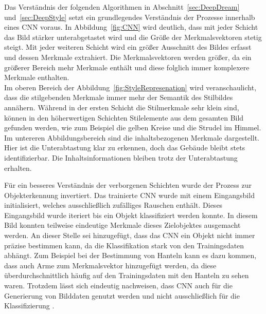\documentclass[times, 11pt,twocolumn]{article}
\begin{document}
\label{sec:Stilsynthese}
Das Verständnis der folgenden Algorithmen in Abschnitt~\ref{sec:DeepDream} und~\ref{sec:DeepStyle} setzt ein grundlegendes Verständnis der Prozesse innerhalb eines CNN voraus. In Abbildung~\ref{fig:CNN} wird deutlich, dass mit jeder Schicht das Bild stärker unterabgetastet wird und die Größe der Merkmalsvektoren stetig steigt. Mit jeder weiteren Schicht wird ein größer Ausschnitt des Bildes erfasst und dessen Merkmale extrahiert. Die Merkmalsvektoren werden größer, da ein größerer Bereich mehr Merkmale enthält und diese folglich immer komplexere Merkmale enthalten. \\
Im oberen Bereich der Abbildung~\ref{fig:StyleRepresenation} wird veranschaulicht, dass die stilgebenden Merkmale immer mehr der Semantik des Stilbildes annähern. Während in der ersten Schicht die Stilmerkmale sehr klein sind, können in den höherwertigen Schichten Stilelemente aus dem gesamten Bild gefunden werden, wie zum Beispiel die gelben Kreise und die Strudel im Himmel. Im untereren Abbildungsbereich sind die inhaltsbezogenen Merkmale dargestellt. Hier ist die Unterabtastung klar zu erkennen, doch das Gebäude bleibt stets identifizierbar. Die Inhaltsinformationen bleiben trotz der Unterabtastung erhalten.

Für ein besseres Verständnis der verborgenen Schichten wurde der Prozess zur Objekterkennung invertiert. Das trainierte CNN wurde mit einem Eingangsbild initialisiert, welches ausschließlich zufälliges Rauschen enthält. Dieses Eingangsbild wurde iteriert bis ein Objekt klassifiziert werden konnte. In diesem Bild konnten teilweise eindeutige Merkmale dieses Zielobjektes ausgemacht werden. An dieser Stelle sei hinzugefügt, dass das CNN ein Objekt nicht immer präzise bestimmen kann, da die Klassifikation stark von den Trainingsdaten abhängt. Zum Beispiel bei der Bestimmung von Hanteln kann es dazu kommen, dass auch Arme zum Merkmalsvektor hinzugefügt werden, da diese überdurchschnittlich häufig auf den Trainingsdaten mit den Hanteln zu sehen waren. 
Trotzdem lässt sich eindeutig nachweisen, dass CNN auch für die Generierung von Bilddaten genutzt werden und nicht ausschließlich für die Klassifizierung \cite{DeepDream}\cite{MahendranV14}.
\end{document}
